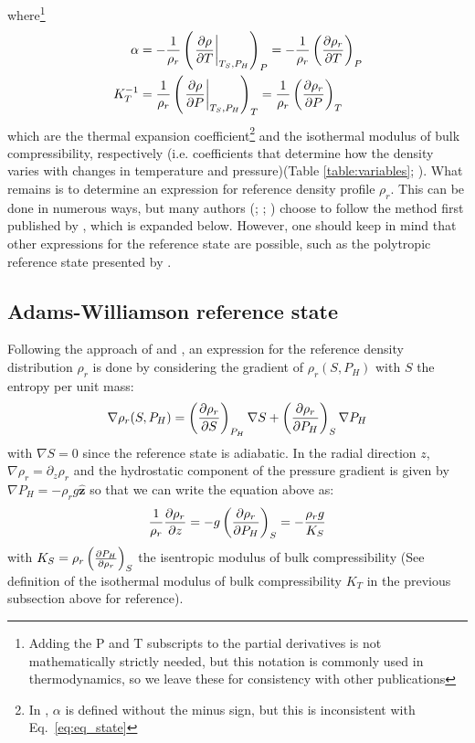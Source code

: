 \documentclass[a4paper]{article}
\begin{document}
where\footnote{Adding the P and T subscripts to the partial derivatives 
is not mathematically strictly needed, but this notation is commonly used in thermodynamics, so
we leave these for consistency with other publications} 
\begin{align*}
    \alpha 
&= - \frac{1}{\rho_r} \left(\left.\frac{\partial \rho}{\partial T}\right|_{T_S,P_H}\right)_P 
= - \frac{1}{\rho_r} \left(\pdv{\rho_r}{T}\right)_P 
\\
    K_T^{-1}
&= \frac{1}{\rho_r} \left(\left.\frac{\partial \rho}{\partial P}\right|_{T_S,P_H}\right)_T
= \frac{1}{\rho_r} \left(\pdv{\rho_r}{P}\right)_T
\end{align*}
which are the thermal expansion coefficient\footnote{In \textcite{jamc80}, $\alpha$ is defined without the minus sign, 
but this is inconsistent with Eq.~\eqref{eq:eq_state}} 
and the isothermal modulus of bulk compressibility, respectively (i.e. coefficients that determine how 
the density varies with changes in temperature and pressure)(Table \ref{table:variables}; \cite{jamc80}). 
What remains is to determine an expression for reference density profile $\rho_r$. 
This can be done in numerous ways, but many authors (\cite{jamc80}; \cite{lezh08}; \cite{itki94}) choose to follow the method first
published by \textcite{birc52}, which is expanded below. However, one should 
keep in mind that other expressions for the reference state are possible, such as the polytropic reference state presented by \textcite{glat88}. 

\subsection{Adams-Williamson reference state}

Following the approach of \textcite{jamc80} and \textcite{birc52}, an expression for the reference 
density distribution $\rho_r$ is done by considering the gradient of $\rho_r(S, P_H)$ with $S$ 
the entropy per unit mass: 
\begin{equation*}
    \nabla\rho_r(S,P_H) = \left(\pdv{\rho_r}{S}\right)_{P_H} \nabla S + \left(\pdv{\rho_r}{P_H}\right)_S\nabla P_H
\end{equation*}
with $\nabla S = 0$ since the reference state is adiabatic. In the radial direction $z$, $\nabla \rho_r = \partial_z \rho_r$ 
and the hydrostatic component of the pressure gradient is given by $\nabla P_H = -\rho_rg \bm{\hat{z}}$ so that 
we can write the equation above as:
\begin{equation} \label{eq:ref_K}
    \frac{1}{\rho_r} \pdv{\rho_r}{z} = -g \left(\pdv{\rho_r}{P_H}\right)_S = -\frac{\rho_r g}{K_S}
\end{equation} 
with $K_S = \rho_r\left(\pdv{P_H}{\rho_r}\right)_S$ the isentropic modulus of bulk compressibility (See definition 
of the isothermal modulus of bulk compressibility $K_T$ in the previous subsection above for reference). 
\end{document}
